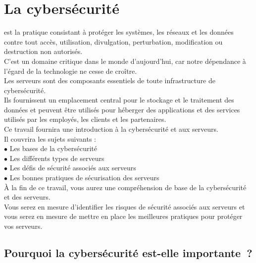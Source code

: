  \paragraph{ }
\section{La cybersécurité }
 est la pratique consistant à protéger les systèmes, les réseaux et les données contre tout accès, utilisation, divulgation, perturbation, modification ou destruction non autorisés.\\
 C'est un domaine critique dans le monde d’aujourd’hui, car notre dépendance à l'égard de la technologie ne cesse de croître.\\

Les serveurs sont des composants essentiels de toute infrastructure de cybersécurité.\\ Ils fournissent un emplacement central pour le stockage et le traitement des données et peuvent être utilisés pour héberger des applications et des services utilisés par les employés, les clients et les partenaires.\\

Ce travail fournira une introduction à la cybersécurité et aux serveurs.\\
 Il couvrira les sujets suivants :\\

$\bullet$ Les bases de la cybersécurité\\
$\bullet$ Les différents types de serveurs\\
$\bullet$ Les défis de sécurité associés aux serveurs\\
$\bullet$ Les bonnes pratiques de sécurisation des serveurs\\

À la fin de ce travail, vous aurez une compréhension de base de la cybersécurité et des serveurs.\\ Vous serez en mesure d'identifier les risques de sécurité associés aux serveurs et vous serez en mesure de mettre en place les meilleures pratiques pour protéger vos serveurs.\\

 \paragraph{ } \subsection{ Pourquoi la cybersécurité est-elle importante ? }   

